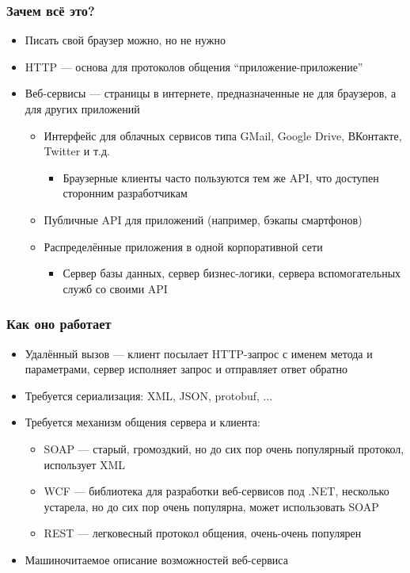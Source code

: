 \documentclass[xetex,mathserif,serif]{beamer}
\begin{document}
    \begin{frame}
        \frametitle{Зачем всё это?}
        \begin{itemize}
            \item Писать свой браузер можно, но не нужно
            \item HTTP --- основа для протоколов общения ``приложение-приложение''
            \item Веб-сервисы --- страницы в интернете, предназначенные не для браузеров, а для других приложений
            \begin{itemize}
                \item Интерфейс для облачных сервисов типа GMail, Google Drive, ВКонтакте, Twitter и т.д.
                \begin{itemize}
                    \item Браузерные клиенты часто пользуются тем же API, что доступен сторонним разработчикам
                \end{itemize}
                \item Публичные API для приложений (например, бэкапы смартфонов)
                \item Распределённые приложения в одной корпоративной сети
                \begin{itemize}
                    \item Сервер базы данных, сервер бизнес-логики, сервера вспомогательных служб со своими API
                \end{itemize}
            \end{itemize}
        \end{itemize}
    \end{frame}

    \begin{frame}
        \frametitle{Как оно работает}
        \begin{itemize}
            \item Удалённый вызов --- клиент посылает HTTP-запрос с именем метода и параметрами, сервер исполняет запрос и отправляет ответ обратно
            \item Требуется сериализация: XML, JSON, protobuf, ...
            \item Требуется механизм общения сервера и клиента:
            \begin{itemize}
                \item SOAP --- старый, громоздкий, но до сих пор очень популярный протокол, использует XML
                \item WCF --- библиотека для разработки веб-сервисов под .NET, несколько устарела, но до сих пор очень популярна, может использовать SOAP
                \item REST --- легковесный протокол общения, очень-очень популярен
            \end{itemize}
            \item Машиночитаемое описание возможностей веб-сервиса
        \end{itemize}
    \end{frame}
\end{document}
